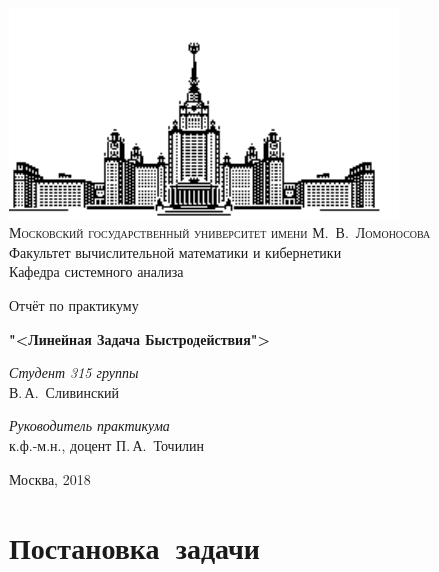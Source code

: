 \documentclass[11pt, oneside, final]{article}
\theoremstyle{break}
\numberwithin{equation}{section}
\theoremstyle{plain}
\theoremstyle{definition}
\begin{document}
    \thispagestyle{empty}
    \begin{center}
        \ \vspace{-3cm}
    
        \includegraphics[width=0.5
        \textwidth]{msu}\\
        {\scshape Московский государственный университет имени М.~В.~Ломоносова}\\
        Факультет вычислительной математики и кибернетики\\
        Кафедра системного анализа
    
        \vfill
    
        {\LARGE Отчёт по практикуму}
    
        \vspace{1cm}
    
        {\Huge\bfseries "<Линейная Задача Быстродействия">} 
    \end{center}

    \vspace{1cm}
    \begin{flushright}
        \large \textit{Студент 315 группы}\\
        В.\,А.~Сливинский
    
        \vspace{5mm}
    
        \textit{Руководитель практикума}\\
        к.ф.-м.н., доцент П.\,А.~Точилин 
    \end{flushright}

    \vfill
    \begin{center}
        Москва, 2018 
    \end{center}
    \pagebreak

    \tableofcontents

    \pagebreak



    \section{Постановка~задачи}
    \label{sec:task}
\end{document}
